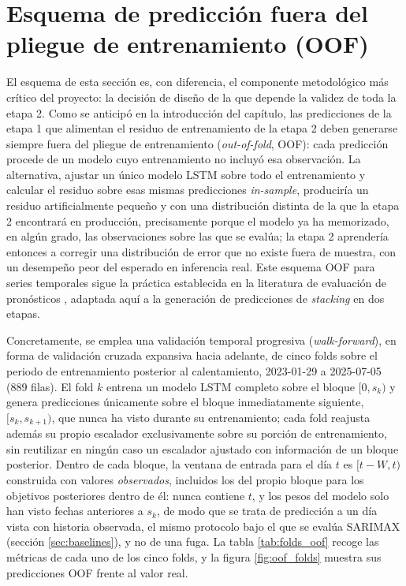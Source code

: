 \section{Esquema de predicción fuera del pliegue de entrenamiento (OOF)}\label{sec:esquema_oof}

El esquema de esta sección es, con diferencia, el componente metodológico más crítico
del proyecto: la decisión de diseño de la que depende la validez de toda la etapa 2. Como
se anticipó en la introducción del capítulo, las predicciones de la etapa 1 que alimentan
el residuo de entrenamiento de la etapa 2 deben generarse siempre fuera del pliegue de
entrenamiento (\emph{out-of-fold}, OOF): cada predicción procede de un modelo cuyo
entrenamiento no incluyó esa observación. La alternativa, ajustar un único modelo LSTM
sobre todo el entrenamiento y calcular el residuo sobre esas mismas predicciones
\emph{in-sample}, produciría un residuo artificialmente pequeño y con una distribución
distinta de la que la etapa 2 encontrará en producción, precisamente porque el modelo ya
ha memorizado, en algún grado, las observaciones sobre las que se evalúa; la etapa 2
aprendería entonces a corregir una distribución de error que no existe fuera de muestra,
con un desempeño peor del esperado en inferencia real. Este esquema OOF para series
temporales sigue la práctica establecida en la literatura de evaluación de pronósticos
\parencite{bergmeir2012cv,cerqueira2020evaluating}, adaptada aquí a la generación de
predicciones de \emph{stacking} \parencite{wolpert1992stacking} en dos etapas.

Concretamente, se emplea una validación temporal progresiva (\emph{walk-forward}), en
forma de validación cruzada expansiva hacia adelante, de cinco folds sobre el periodo de
entrenamiento posterior al calentamiento, 2023-01-29 a 2025-07-05 (889 filas). El fold $k$
entrena un modelo LSTM completo sobre el bloque $[0, s_k)$ y genera predicciones
únicamente sobre el bloque inmediatamente siguiente, $[s_k, s_{k+1})$, que nunca ha visto
durante su entrenamiento; cada fold reajusta además su propio escalador exclusivamente
sobre su porción de entrenamiento, sin reutilizar en ningún caso un escalador ajustado
con información de un bloque posterior. Dentro de cada bloque, la ventana de entrada para el
día $t$ es $[t-W, t)$ construida con valores \emph{observados}, incluidos los del propio
bloque para los objetivos posteriores dentro de él: nunca contiene $t$, y los pesos del
modelo solo han visto fechas anteriores a $s_k$, de modo que se trata de predicción a un
día vista con historia observada, el mismo protocolo bajo el que se evalúa SARIMAX
(sección \ref{sec:baselines}), y no de una fuga. La tabla \ref{tab:folds_oof} recoge las
métricas de cada uno de los cinco folds, y la figura \ref{fig:oof_folds} muestra sus
predicciones OOF frente al valor real.

